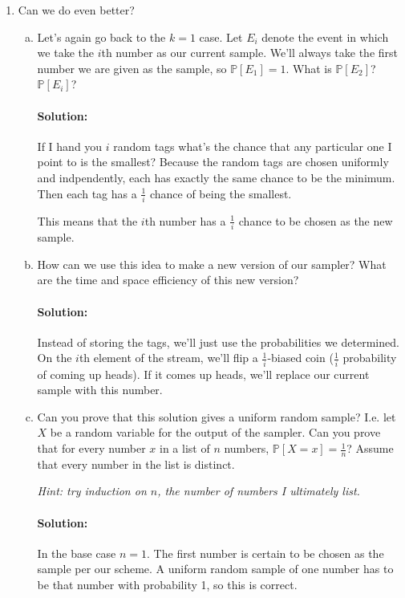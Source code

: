 \documentclass{article}
\begin{document}
\begin{enumerate}[1.]
\clearpage
\item %
  Can we do even better?

  \begin{enumerate}[a.]
  \item %
    Let's again go back to the $k=1$ case. Let $E_i$ denote the event in which
    we take the $i$th number as our current sample. We'll always take the first number we
    are given as the sample, so $\mathbb{P}[E_1] = 1$. What is
    $\mathbb{P}[E_2]$? $\mathbb{P}[E_i]$?

    \paragraph{Solution:} If I hand you $i$ random tags what's the chance that any
    particular one I point to is the smallest? Because the random tags are
    chosen uniformly and indpendently, each has exactly the same chance to
    be the minimum. Then each tag has a $\frac{1}{i}$ chance of being the smallest.

    This means that the $i$th number has a $\frac{1}{i}$ chance to be chosen as
    the new sample.

  \item %
    How can we use this idea to make a new version of our sampler? What are the
    time and space efficiency of this new version?

    \paragraph{Solution:} Instead of storing the tags, we'll just use the
    probabilities we determined. On the $i$th element of the stream, we'll flip
    a $\frac{1}{i}$-biased coin ($\frac{1}{i}$ probability of coming up heads).
    If it comes up heads, we'll replace our current sample with this number.

  \item %
    Can you prove that this solution gives a uniform random sample? I.e. let $X$
    be a random variable for the output of the sampler. Can you prove that for
    every number $x$ in a list of $n$ numbers, $\mathbb{P}[X = x] =
    \frac{1}{n}$? Assume that every number in the list is distinct.

    \textit{Hint: try induction on $n$, the number of numbers I ultimately list.}

    \paragraph{Solution:} In the base case $n=1$. The first number is certain to
    be chosen as the sample per our scheme. A uniform random sample of one
    number has to be that number with probability 1, so this is correct.


\end{enumerate}
\end{enumerate}
\end{document}

